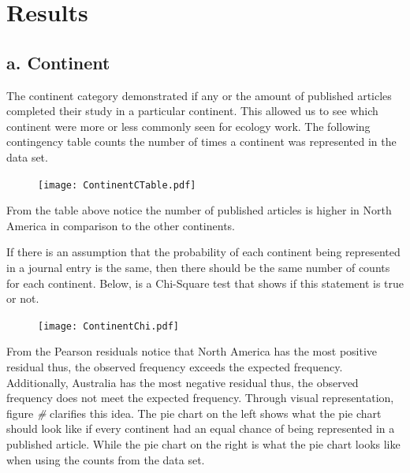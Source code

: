 \documentclass[
]{article}
\begin{document}
\hypertarget{results}{%
\section{Results}\label{results}}

\hypertarget{a.-continent}{%
\subsection{a. Continent}\label{a.-continent}}

The continent category demonstrated if any or the amount of published
articles completed their study in a particular continent. This allowed
us to see which continent were more or less commonly seen for ecology
work. The following contingency table counts the number of times a
continent was represented in the data set.

\begin{figure}
    \centering
    \texttt{[image: ContinentCTable.pdf]}
    \label{fig:Contingency Table}
\end{figure}

From the table above notice the number of published articles is higher
in North America in comparison to the other continents.

If there is an assumption that the probability of each continent being
represented in a journal entry is the same, then there should be the
same number of counts for each continent. Below, is a Chi-Square test
that shows if this statement is true or not.

\begin{figure}
    \centering
    \texttt{[image: ContinentChi.pdf]}
    \label{fig:Continent Chi-Square}
\end{figure}

From the Pearson residuals notice that North America has the most
positive residual thus, the observed frequency exceeds the expected
frequency. Additionally, Australia has the most negative residual thus,
the observed frequency does not meet the expected frequency. Through
visual representation, figure \emph{\#} clarifies this idea. The pie
chart on the left shows what the pie chart should look like if every
continent had an equal chance of being represented in a published
article. While the pie chart on the right is what the pie chart looks
like when using the counts from the data set.
\end{document}
